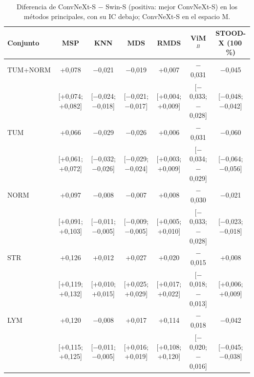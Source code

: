 \begin{table}
\centering
\footnotesize
\setlength{\tabcolsep}{2.5pt}
\caption{Diferencia de \AUROC ConvNeXt-S $-$ Swin-S (positiva: mejor ConvNeXt-S) en los métodos principales, con su IC debajo; ConvNeXt-S en el espacio M.}
\label{tab:convnext-diferencias}
\begin{tabular*}{\linewidth}{@{\extracolsep{\fill}}lcccccc}
\toprule
Conjunto & MSP & KNN & MDS & RMDS & ViM$^{B}$ & STOOD-X (100\,\%) \\
\midrule
TUM+NORM & +0{,}078 & $-$0{,}021 & $-$0{,}019 & +0{,}007 & $-$0{,}031 & $-$0{,}045 \\
& {\scriptsize [+0{,}074; +0{,}082]} & {\scriptsize [$-$0{,}024; $-$0{,}018]} & {\scriptsize [$-$0{,}021; $-$0{,}017]} & {\scriptsize [+0{,}004; +0{,}009]} & {\scriptsize [$-$0{,}033; $-$0{,}028]} & {\scriptsize [$-$0{,}048; $-$0{,}042]} \\[2pt]
TUM & +0{,}066 & $-$0{,}029 & $-$0{,}026 & +0{,}006 & $-$0{,}031 & $-$0{,}060 \\
& {\scriptsize [+0{,}061; +0{,}072]} & {\scriptsize [$-$0{,}032; $-$0{,}026]} & {\scriptsize [$-$0{,}029; $-$0{,}024]} & {\scriptsize [+0{,}003; +0{,}009]} & {\scriptsize [$-$0{,}034; $-$0{,}029]} & {\scriptsize [$-$0{,}064; $-$0{,}056]} \\[2pt]
NORM & +0{,}097 & $-$0{,}008 & $-$0{,}007 & +0{,}008 & $-$0{,}030 & $-$0{,}021 \\
& {\scriptsize [+0{,}091; +0{,}103]} & {\scriptsize [$-$0{,}011; $-$0{,}005]} & {\scriptsize [$-$0{,}009; $-$0{,}005]} & {\scriptsize [+0{,}005; +0{,}010]} & {\scriptsize [$-$0{,}033; $-$0{,}028]} & {\scriptsize [$-$0{,}023; $-$0{,}018]} \\[2pt]
STR & +0{,}126 & +0{,}012 & +0{,}027 & +0{,}020 & $-$0{,}015 & +0{,}008 \\
& {\scriptsize [+0{,}119; +0{,}132]} & {\scriptsize [+0{,}010; +0{,}015]} & {\scriptsize [+0{,}025; +0{,}029]} & {\scriptsize [+0{,}017; +0{,}022]} & {\scriptsize [$-$0{,}018; $-$0{,}013]} & {\scriptsize [+0{,}006; +0{,}009]} \\[2pt]
LYM & +0{,}120 & $-$0{,}008 & +0{,}017 & +0{,}114 & $-$0{,}018 & $-$0{,}042 \\
& {\scriptsize [+0{,}115; +0{,}125]} & {\scriptsize [$-$0{,}011; $-$0{,}005]} & {\scriptsize [+0{,}016; +0{,}019]} & {\scriptsize [+0{,}108; +0{,}120]} & {\scriptsize [$-$0{,}020; $-$0{,}016]} & {\scriptsize [$-$0{,}045; $-$0{,}038]} \\[2pt]

\end{tabular*}
\end{table}
